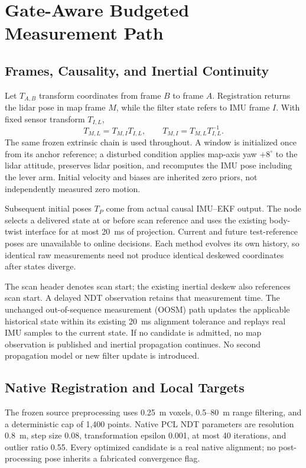 \documentclass[journal,10pt,letterpaper]{IEEEtran}
\begin{document}
\section{Gate-Aware Budgeted Measurement Path}
\subsection{Frames, Causality, and Inertial Continuity}
Let $T_{A,B}$ transform coordinates from frame $B$ to frame $A$. Registration returns the lidar pose in map frame $M$, while the filter state refers to IMU frame $I$. With fixed sensor transform $T_{I,L}$,
\begin{equation}
 T_{M,L}=T_{M,I}T_{I,L},\qquad
 T_{M,I}=T_{M,L}T_{I,L}^{-1}.
 \label{eq:frames}
\end{equation}
The same frozen extrinsic chain is used throughout. A window is initialized once from its anchor reference; a disturbed condition applies map-axis yaw $+8^\circ$ to the lidar attitude, preserves lidar position, and recomputes the IMU pose including the lever arm. Initial velocity and biases are inherited zero priors, not independently measured zero motion.

Subsequent initial poses $T_P$ come from actual causal IMU--EKF output. The node selects a delivered state at or before scan reference and uses the existing body-twist interface for at most 20~ms of projection. Current and future test-reference poses are unavailable to online decisions. Each method evolves its own history, so identical raw measurements need not produce identical deskewed coordinates after states diverge.

The scan header denotes scan start; the existing inertial deskew also references scan start. A delayed NDT observation retains that measurement time. The unchanged out-of-sequence measurement (OOSM) path updates the applicable historical state within its existing 20~ms alignment tolerance and replays real IMU samples to the current state. If no candidate is admitted, no map observation is published and inertial propagation continues. No second propagation model or new filter update is introduced.

\subsection{Native Registration and Local Targets}
The frozen source preprocessing uses 0.25~m voxels, 0.5--80~m range filtering, and a deterministic cap of 1,400 points. Native PCL NDT parameters are resolution 0.8~m, step size 0.08, transformation epsilon 0.001, at most 40 iterations, and outlier ratio 0.55. Every optimized candidate is a real native alignment; no post-processing pose inherits a fabricated convergence flag.
\end{document}
